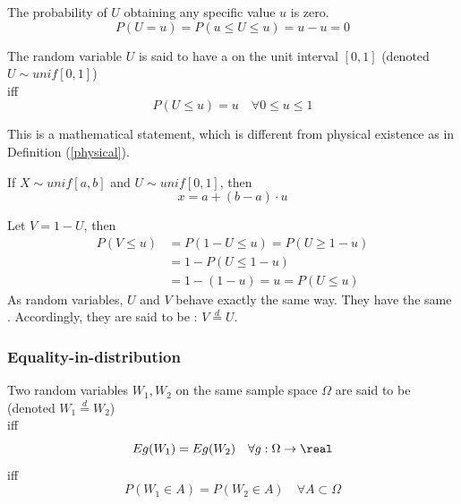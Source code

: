 \documentclass[11pt]{article}
\numberwithin{equation}{section}
\begin{document}
\corollary
The probability of $U$ obtaining any specific value $u$ is zero.
\begin{equation}
	P(U = u) = P(u \leq U \leq u) = u - u = 0
\end{equation}

 The random variable $U$ is said to have a  on the unit interval $[0, 1]$ (denoted $U \sim unif[0, 1]$) \\
iff \\
\begin{equation}
	P(U \leq u) = u \quad \forall 0 \leq u \leq 1
\end{equation}

\remark
This is a mathematical statement, which is different from physical existence as in Definition (\ref{physical}).

\corollary
If $X \sim unif[a, b]$ and $U \sim unif[0, 1]$, then
\begin{equation}
	x = a + (b-a)\cdot u
\end{equation}

\example
Let $V = 1 - U$, then
\begin{align}
	P(V \leq u) &= P(1-U \leq u) = P(U \geq 1-u) \\
	&= 1 - P(U \leq 1 - u) \\
	&= 1 - (1-u) = u = P(U \leq u)
\end{align}
As random variables, $U$ and $V$ behave exactly the same way. They have the same . Accordingly, they are said to be : $V \overset{d}{=} U$.

\subsubsection{Equality-in-distribution}
 Two random variables $W_1, W_2$ on the same sample space $\Omega$ are said to be  (denoted $W_1 \overset{d}{=} W_2$)\\
iff \\
\begin{equation}
	Eg(W_1) = Eg(W_2) \quad \forall g: \Omega \rightarrow \real
\end{equation}
iff \\
\begin{equation}
	P(W_1 \in A) = P(W_2 \in A) \quad \forall A \subset \Omega
\end{equation}
\end{document}
